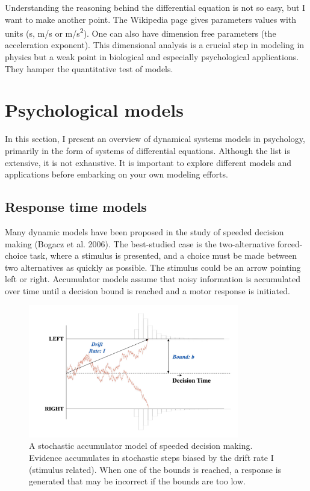 \documentclass[
  letterpaper,
]{scrbook}
\begin{document}
Understanding the reasoning behind the differential equation is not so
easy, but I want to make another point. The Wikipedia page gives
parameters values with units (s, m/s or m/s\textsuperscript{2}). One can
also have dimension free parameters (the acceleration exponent). This
dimensional analysis is a crucial step in modeling in physics but a weak
point in biological and especially psychological applications. They
hamper the quantitative test of models.

\hypertarget{psychological-models}{%
\section{Psychological models}\label{psychological-models}}

In this section, I present an overview of dynamical systems models in
psychology, primarily in the form of systems of differential equations.
Although the list is extensive, it is not exhaustive. It is important to
explore different models and applications before embarking on your own
modeling efforts.

\hypertarget{response-time-models}{%
\subsection{Response time models}\label{response-time-models}}

Many dynamic models have been proposed in the study of speeded decision
making (Bogacz et al. 2006). The best-studied case is the
two-alternative forced-choice task, where a stimulus is presented, and a
choice must be made between two alternatives as quickly as possible. The
stimulus could be an arrow pointing left or right. Accumulator models
assume that noisy information is accumulated over time until a decision
bound is reached and a motor response is initiated.

\begin{figure}

{\centering \includegraphics[width=3.60948in,height=\textheight]{media/ch5/image7.jpg}

}

\caption{\label{fig-ch5-img7-old-55}A stochastic accumulator model of
speeded decision making. Evidence accumulates in stochastic steps biased
by the drift rate I (stimulus related). When one of the bounds is
reached, a response is generated that may be incorrect if the bounds are
too low.}

\end{figure}
\end{document}
